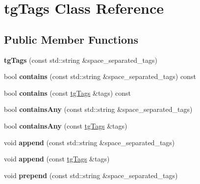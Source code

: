 \hypertarget{classtg_tags}{\section{tg\-Tags Class Reference}
\label{classtg_tags}
}
\subsection*{Public Member Functions}
\begin{DoxyCompactItemize}
\item 
\hypertarget{classtg_tags_ac93d5dfee24ebff6b11400779ab65878}{{\bfseries tg\-Tags} (const std\-::string \&space\-\_\-separated\-\_\-tags)}\label{classtg_tags_ac93d5dfee24ebff6b11400779ab65878}

\item 
\hypertarget{classtg_tags_a7bbc06c60e5fb819b3f8f63ab97fcb4b}{bool {\bfseries contains} (const std\-::string \&space\-\_\-separated\-\_\-tags) const }\label{classtg_tags_a7bbc06c60e5fb819b3f8f63ab97fcb4b}

\item 
\hypertarget{classtg_tags_a6983161116c8f1e6a070c1f11e697ce8}{bool {\bfseries contains} (const \hyperlink{classtg_tags}{tg\-Tags} \&tags) const }\label{classtg_tags_a6983161116c8f1e6a070c1f11e697ce8}

\item 
\hypertarget{classtg_tags_a39b9bb843e19d2fe706b49ded30d462a}{bool {\bfseries contains\-Any} (const std\-::string \&space\-\_\-separated\-\_\-tags)}\label{classtg_tags_a39b9bb843e19d2fe706b49ded30d462a}

\item 
\hypertarget{classtg_tags_a6380510343e29237314edee22d3ef62e}{bool {\bfseries contains\-Any} (const \hyperlink{classtg_tags}{tg\-Tags} \&tags)}\label{classtg_tags_a6380510343e29237314edee22d3ef62e}

\item 
\hypertarget{classtg_tags_ae3d956da515b68c7665783339ab3604d}{void {\bfseries append} (const std\-::string \&space\-\_\-separated\-\_\-tags)}\label{classtg_tags_ae3d956da515b68c7665783339ab3604d}

\item 
\hypertarget{classtg_tags_a31a51434fef11661761b71f9956ec454}{void {\bfseries append} (const \hyperlink{classtg_tags}{tg\-Tags} \&tags)}\label{classtg_tags_a31a51434fef11661761b71f9956ec454}

\item 
\hypertarget{classtg_tags_ad4f479a0ed7424008fa815b039d822e0}{void {\bfseries prepend} (const std\-::string \&space\-\_\-separated\-\_\-tags)}\label{classtg_tags_ad4f479a0ed7424008fa815b039d822e0}


\end{DoxyCompactItemize}
